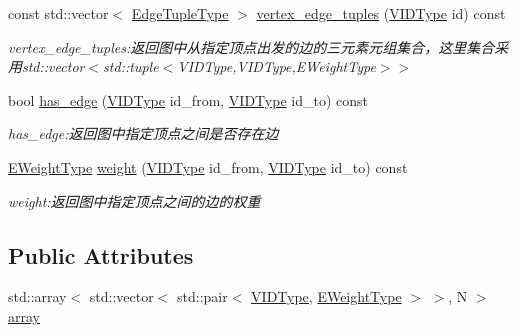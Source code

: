 \begin{DoxyCompactItemize}
const std\+::vector$<$ \hyperlink{struct_introduction_to_algorithm_1_1_graph_algorithm_1_1_a_d_j_list_graph_a6757574602df8359b10e37079c789eb6}{Edge\+Tuple\+Type} $>$ \hyperlink{struct_introduction_to_algorithm_1_1_graph_algorithm_1_1_a_d_j_list_graph_a8d4f953211df8bd5d3fffe6e362a7fa3}{vertex\+\_\+edge\+\_\+tuples} (\hyperlink{struct_introduction_to_algorithm_1_1_graph_algorithm_1_1_a_d_j_list_graph_aa42303d15a6a0e4cf6fad5c1327c1d79}{V\+I\+D\+Type} id) const 
\begin{DoxyCompactList}\small\item\em vertex\+\_\+edge\+\_\+tuples\+:返回图中从指定顶点出发的边的三元素元组集合，这里集合采用{\ttfamily std\+::vector$<$std\+::tuple$<$V\+I\+D\+Type,V\+I\+D\+Type,E\+Weight\+Type$>$$>$} \end{DoxyCompactList}\item 
bool \hyperlink{struct_introduction_to_algorithm_1_1_graph_algorithm_1_1_a_d_j_list_graph_aa0fd43a6621de69396f907e11cff5db4}{has\+\_\+edge} (\hyperlink{struct_introduction_to_algorithm_1_1_graph_algorithm_1_1_a_d_j_list_graph_aa42303d15a6a0e4cf6fad5c1327c1d79}{V\+I\+D\+Type} id\+\_\+from, \hyperlink{struct_introduction_to_algorithm_1_1_graph_algorithm_1_1_a_d_j_list_graph_aa42303d15a6a0e4cf6fad5c1327c1d79}{V\+I\+D\+Type} id\+\_\+to) const 
\begin{DoxyCompactList}\small\item\em has\+\_\+edge\+:返回图中指定顶点之间是否存在边 \end{DoxyCompactList}\item 
\hyperlink{struct_introduction_to_algorithm_1_1_graph_algorithm_1_1_a_d_j_list_graph_a8b9518587536b482cfd8c2fc7f5c9678}{E\+Weight\+Type} \hyperlink{struct_introduction_to_algorithm_1_1_graph_algorithm_1_1_a_d_j_list_graph_a8279dc0ecc39324c1f0e38a3c0a2ef03}{weight} (\hyperlink{struct_introduction_to_algorithm_1_1_graph_algorithm_1_1_a_d_j_list_graph_aa42303d15a6a0e4cf6fad5c1327c1d79}{V\+I\+D\+Type} id\+\_\+from, \hyperlink{struct_introduction_to_algorithm_1_1_graph_algorithm_1_1_a_d_j_list_graph_aa42303d15a6a0e4cf6fad5c1327c1d79}{V\+I\+D\+Type} id\+\_\+to) const 
\begin{DoxyCompactList}\small\item\em weight\+:返回图中指定顶点之间的边的权重 \end{DoxyCompactList}\end{DoxyCompactItemize}
\subsection*{Public Attributes}
\begin{DoxyCompactItemize}
\item 
std\+::array$<$ std\+::vector$<$ std\+::pair$<$ \hyperlink{struct_introduction_to_algorithm_1_1_graph_algorithm_1_1_a_d_j_list_graph_aa42303d15a6a0e4cf6fad5c1327c1d79}{V\+I\+D\+Type}, \hyperlink{struct_introduction_to_algorithm_1_1_graph_algorithm_1_1_a_d_j_list_graph_a8b9518587536b482cfd8c2fc7f5c9678}{E\+Weight\+Type} $>$ $>$, N $>$ \hyperlink{struct_introduction_to_algorithm_1_1_graph_algorithm_1_1_a_d_j_list_graph_ac02abc1501b57a7963ec1b388150429e}{array}
\end{DoxyCompactItemize}
